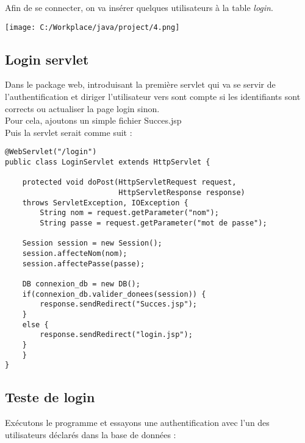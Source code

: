 \documentclass[12]{article}
\begin{document}
Afin de se connecter, on va insérer quelques utilisateurs à la table \textit{login}.\\


\begin{center}
\texttt{[image: C:/Workplace/java/project/4.png]}
\end{center}






\subsection{Login servlet}

Dans le package web, introduisant la première servlet qui va se servir de l'authentification et diriger l'utilisateur vers sont compte si les identifiants sont corrects ou actualiser la page login sinon.\\

Pour cela, ajoutons un simple fichier Succes.jsp \\


Puis la servlet serait comme suit :\\

\begin{scriptsize}
\lstset{language=java}
\begin{lstlisting}
@WebServlet("/login")
public class LoginServlet extends HttpServlet {
	
	protected void doPost(HttpServletRequest request, 
						  HttpServletResponse response) 
	throws ServletException, IOException {
		String nom = request.getParameter("nom");
		String passe = request.getParameter("mot de passe");
		
	Session session = new Session();
	session.affecteNom(nom);
	session.affectePasse(passe);
	
	DB connexion_db = new DB();
	if(connexion_db.valider_donees(session)) {
		response.sendRedirect("Succes.jsp");
	}
	else {
		response.sendRedirect("login.jsp");
	}
	}
}

\end{lstlisting}
\end{scriptsize}



\subsection{Teste de login}

Exécutons le programme et essayons une authentification avec l'un des utilisateurs déclarés dans la base de données :\\
\end{document}
